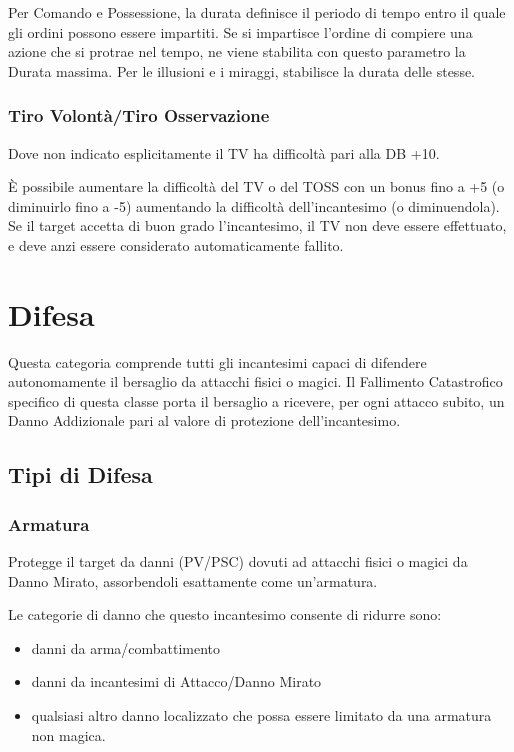 Per Comando e Possessione, la durata definisce il periodo di tempo
entro il quale gli ordini possono essere impartiti.  Se si impartisce
l'ordine di compiere una azione che si protrae nel tempo, ne viene
stabilita con questo parametro la Durata massima.  Per le illusioni e
i miraggi, stabilisce la durata delle stesse.

\subsubsection{Tiro Volont\`a/Tiro Osservazione}

 Dove non indicato
esplicitamente il TV ha difficolt\`a pari alla DB +10. 

\`E possibile aumentare
la difficolt\`a del TV o del TOSS con un bonus fino a +5 (o diminuirlo fino
a -5) aumentando la difficolt\`a dell'incantesimo (o diminuendola). Se il
target accetta di buon grado l'incantesimo, il TV non deve essere effettuato,
e deve anzi essere considerato automaticamente fallito.


\section{Difesa} 

Questa categoria comprende tutti gli incantesimi capaci di difendere
autonomamente il bersaglio da attacchi fisici o magici. Il Fallimento
Catastrofico specifico di questa classe porta il bersaglio a ricevere,
per ogni attacco subito, un Danno Addizionale pari al valore di
protezione dell'incantesimo.

\subsection{Tipi di Difesa}

\subsubsection{Armatura} 

Protegge il target da danni (PV/PSC) dovuti ad attacchi fisici o magici da
Danno Mirato, assorbendoli esattamente come un'armatura.

Le categorie di danno che questo incantesimo consente di ridurre sono:

\begin{itemize}
\itemsep -6pt
\item danni da arma/combattimento
\item danni da incantesimi di Attacco/Danno Mirato
\item qualsiasi altro danno localizzato che possa essere
limitato da una armatura non magica.  
\end{itemize}

